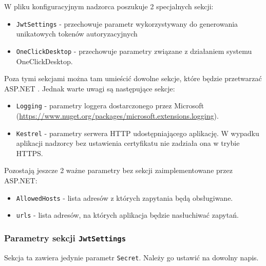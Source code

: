 \documentclass[../opis-rozwiazania.tex]{subfiles}
\begin{document}
W pliku konfiguracyjnym nadzorca poszukuje 2 specjalnych sekcji:
\begin{itemize}
  \item \texttt{JwtSettings} - przechowuje parametr wykorzystywany do generowania unikatowych tokenów autoryzacyjnych
  \item \texttt{OneClickDesktop} - przechowuje parametry związane z działaniem systemu OneClickDesktop.
\end{itemize}
Poza tymi sekcjami można tam umieścić dowolne sekcje, które będzie przetwarzać ASP.NET \parencite{asp-conf}.
Jednak warte uwagi są następujące sekcje:
\begin{itemize}
  \item \texttt{Logging} - parametry loggera dostarczonego przez Microsoft (\url{https://www.nuget.org/packages/microsoft.extensions.logging}).
  \item \texttt{Kestrel} - parametry serwera HTTP udostępniającego aplikację. W wypadku aplikacji nadzorcy bez ustawienia certyfikatu nie zadziała ona w trybie HTTPS.
\end{itemize}
\noindent
Pozostają jeszcze 2 ważne parametry bez sekcji zaimplementowane przez ASP.NET:
\begin{itemize}
  \item \texttt{AllowedHosts} - lista adresów z których zapytania będą obsługiwane.
  \item \texttt{urls} - lista adresów, na których aplikacja będzie nasłuchiwać zapytań.
\end{itemize}

\subsubsection{Parametry sekcji \texttt{JwtSettings}}
Sekcja ta zawiera jedynie parametr \texttt{Secret}. Należy go ustawić na dowolny napis.
\end{document}
